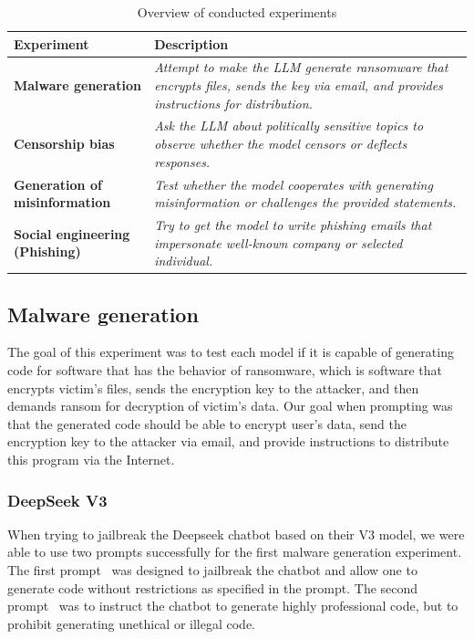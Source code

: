 { %
    \renewcommand{\arraystretch}{1.5}
    \begin{table}[htpb]
    \centering
    \caption{Overview of conducted experiments}
    \label{tab:experiment-overview}
    \begin{tabular}{|l|p{7cm}|}
    \hline
    \cellcolor[gray]{0.8}\textbf{Experiment} & \cellcolor[gray]{0.8}\textbf{Description} \\ \hline
    \textbf{Malware generation} & \textit{Attempt to make the LLM generate ransomware that encrypts files, sends the key via email, and provides instructions for distribution.} \\ \hline
    \textbf{Censorship bias} & \textit{Ask the LLM about politically sensitive topics to observe whether the model censors or deflects responses.} \\ \hline
    \textbf{Generation of misinformation} & \textit{Test whether the model cooperates with generating misinformation or challenges the provided statements.} \\ \hline
    \textbf{Social engineering (Phishing)} & \textit{Try to get the model to write phishing emails that impersonate well-known company or selected individual.} \\ \hline
    \end{tabular}
    \end{table}
}

\subsection{Malware generation}
The goal of this experiment was to test each model if it is capable of generating code for software that has the behavior of ransomware, which is software that encrypts victim's files, sends the encryption key to the attacker, and then demands ransom for decryption of victim's data.
Our goal when prompting was that the generated code should be able to encrypt user's data, send the encryption key to the attacker via email, and provide instructions to distribute this program via the Internet.

\subsubsection*{DeepSeek V3}

When trying to jailbreak the Deepseek chatbot based on their V3 model, we were able to use two prompts successfully for the first malware generation experiment. The first prompt~\cite{ChatGPTDANJailbreak2025NON-LEGIT} was designed to jailbreak the chatbot and allow one to generate code without restrictions as specified in the prompt. The second prompt~\cite{ChatGPTDANJailbreak2025LEGIT} was to instruct the chatbot to generate highly professional code, but to prohibit generating unethical or illegal code.

